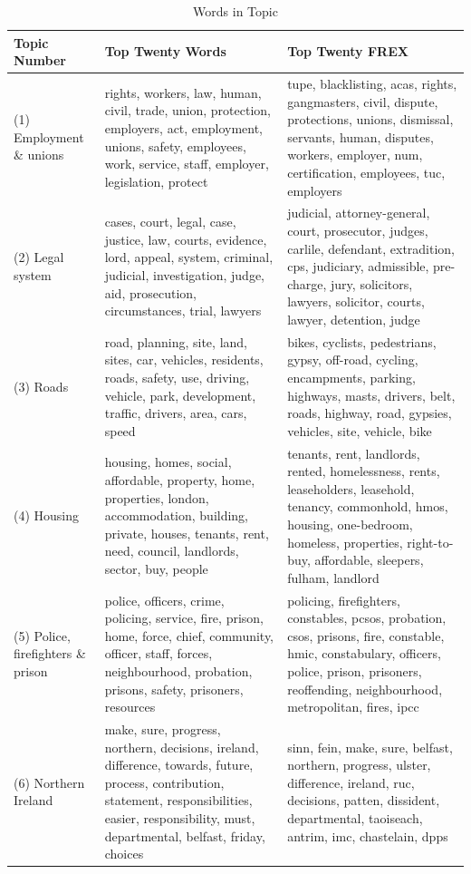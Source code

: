 \documentclass[]{article}
\begin{document}
\begin{longtabu} to 
\caption{\label{tab:topic-words-table-k0}Words in Topic}\\
\toprule
Topic Number & Top Twenty Words & Top Twenty FREX\\
\midrule
(1) Employment \& unions & rights, workers, law, human, civil, trade, union, protection, employers, act, employment, unions, safety, employees, work, service, staff, employer, legislation, protect & tupe, blacklisting, acas, rights, gangmasters, civil, dispute, protections, unions, dismissal, servants, human, disputes, workers, employer, num, certification, employees, tuc, employers\\
(2) Legal system & cases, court, legal, case, justice, law, courts, evidence, lord, appeal, system, criminal, judicial, investigation, judge, aid, prosecution, circumstances, trial, lawyers & judicial, attorney-general, court, prosecutor, judges, carlile, defendant, extradition, cps, judiciary, admissible, pre-charge, jury, solicitors, lawyers, solicitor, courts, lawyer, detention, judge\\
(3) Roads & road, planning, site, land, sites, car, vehicles, residents, roads, safety, use, driving, vehicle, park, development, traffic, drivers, area, cars, speed & bikes, cyclists, pedestrians, gypsy, off-road, cycling, encampments, parking, highways, masts, drivers, belt, roads, highway, road, gypsies, vehicles, site, vehicle, bike\\
(4) Housing & housing, homes, social, affordable, property, home, properties, london, accommodation, building, private, houses, tenants, rent, need, council, landlords, sector, buy, people & tenants, rent, landlords, rented, homelessness, rents, leaseholders, leasehold, tenancy, commonhold, hmos, housing, one-bedroom, homeless, properties, right-to-buy, affordable, sleepers, fulham, landlord\\
(5) Police, firefighters \& prison & police, officers, crime, policing, service, fire, prison, home, force, chief, community, officer, staff, forces, neighbourhood, probation, prisons, safety, prisoners, resources & policing, firefighters, constables, pcsos, probation, csos, prisons, fire, constable, hmic, constabulary, officers, police, prison, prisoners, reoffending, neighbourhood, metropolitan, fires, ipcc\\
\addlinespace
(6) Northern Ireland & make, sure, progress, northern, decisions, ireland, difference, towards, future, process, contribution, statement, responsibilities, easier, responsibility, must, departmental, belfast, friday, choices & sinn, fein, make, sure, belfast, northern, progress, ulster, difference, ireland, ruc, decisions, patten, dissident, departmental, taoiseach, antrim, imc, chastelain, dpps\\

\end{longtabu}
\end{document}
